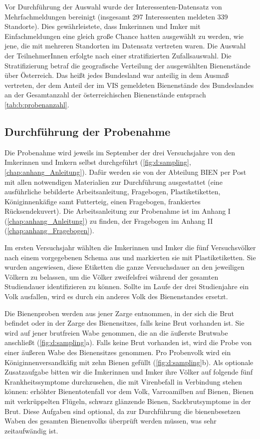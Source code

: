 Vor Durchführung der Auswahl wurde der Interessenten-Datensatz von Mehrfachmeldungen bereinigt (insgesamt 297 Interessenten meldeten 339 Standorte). Dies gewährleistete, dass Imkerinnen und Imker mit Einfachmeldungen eine gleich große Chance hatten ausgewählt zu werden, wie jene, die mit mehreren Standorten im Datensatz vertreten waren. Die Auswahl der TeilnehmerInnen erfolgte nach einer stratifizierten Zufallsauswahl. Die Stratifizierung betraf die geografische Verteilung der ausgewählten Bienenstände über Österreich. Das heißt jedes Bundesland war anteilig in dem Ausmaß vertreten, der dem Anteil der im VIS gemeldeten Bienenstände des Bundeslandes an der Gesamtanzahl der österreichischen Bienenstände entsprach \cref{tab:b:probenanzahl}.



\subsection{Durchführung der Probenahme} \label{chap:probenahme}

Die Probenahme wird jeweils im September der drei Versuchsjahre von den Imkerinnen und Imkern selbst durchgeführt (\cref{fig:d:sampling}, \cref{chap:anhang_Anleitung}). Dafür werden sie von der Abteilung BIEN per Post mit allen notwendigen Materialien zur Durchführung ausgestattet (eine ausführliche bebilderte Arbeitsanleitung, Fragebogen, Plastiketiketten, Königinnenkäfige samt Futterteig, einen Fragebogen, frankiertes Rücksendekuvert). Die Arbeitsanleitung zur Probenahme ist im Anhang I (\cref{chap:anhang_Anleitung}) zu finden, der Fragebogen im Anhang II (\cref{chap:anhang_Fragebogen}).

Im ersten Versuchsjahr wählten die Imkerinnen und Imker die fünf Versuchsvölker nach einem vorgegebenen Schema aus und markierten sie mit Plastiketiketten. Sie wurden angewiesen, diese Etiketten die ganze Versuchsdauer an den jeweiligen Völkern zu belassen, um die Völker zweifelsfrei während der gesamten Studiendauer identifizieren zu können. Sollte im Laufe der drei Studienjahre ein Volk ausfallen, wird es durch ein anderes Volk des Bienenstandes ersetzt.

Die Bienenproben werden aus jener Zarge entnommen, in der sich die Brut befindet oder in der Zarge des Bienensitzes, falls keine Brut vorhanden ist. Sie wird auf jener brutfreien Wabe genommen, die an die äußerste Brutwabe anschließt (\cref{fig:d:sampling}a). Falls keine Brut vorhanden ist, wird die Probe von einer äußeren Wabe des Bienensitzes genommen. Pro Probenvolk wird ein Königinnenversandkäfig mit zehn Bienen gefüllt (\cref{fig:d:sampling}b). Als optionale Zusatzaufgabe bitten wir die Imkerinnen und Imker ihre Völker auf folgende fünf Krankheitssymptome durchzusehen, die mit Virenbefall in Verbindung stehen können: erhöhter Bienentotenfall vor dem Volk, Varroamilben auf Bienen, Bienen mit verkrüppelten Flügeln, schwarz glänzende Bienen, Sackbrutsymptome in der Brut. 
Diese Aufgaben sind optional, da zur Durchführung die bienenbesetzen Waben des gesamten Bienenvolks überprüft werden müssen, was sehr zeitaufwändig ist.


